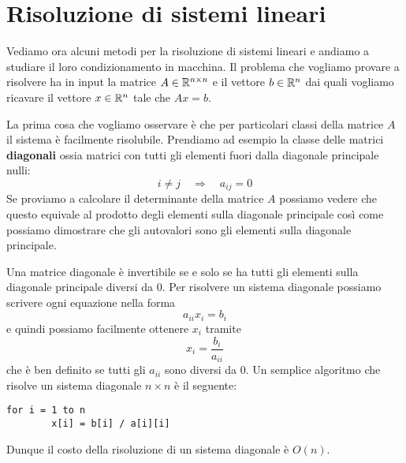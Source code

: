 \section{Risoluzione di sistemi lineari}
Vediamo ora alcuni metodi per la risoluzione di sistemi lineari e andiamo a studiare il loro condizionamento
in macchina. Il problema che vogliamo provare a risolvere ha in input la matrice $A \in \mathbb{R}^{n \times n}$ e il
vettore $b \in \mathbb{R}^n$ dai quali vogliamo ricavare il vettore $x \in \mathbb{R}^n$ tale che $A x = b$.

La prima cosa che vogliamo osservare è che per particolari classi della matrice $A$ il sistema è facilmente
risolubile. Prendiamo ad esempio la classe delle matrici \textbf{diagonali} ossia matrici con tutti gli elementi
fuori dalla diagonale principale nulli:
\[ i \neq j \quad \Rightarrow \quad a_{ij} = 0 \]
Se proviamo a calcolare il determinante della matrice $A$ possiamo vedere che questo equivale al prodotto degli
elementi sulla diagonale principale così come possiamo dimostrare che gli autovalori sono gli elementi sulla
diagonale principale.

Una matrice diagonale è invertibile se e solo se ha tutti gli elementi sulla diagonale principale diversi da 0.
Per risolvere un sistema diagonale possiamo scrivere ogni equazione nella forma
\[ a_{ii} x_i = b_i \]
e quindi possiamo facilmente ottenere $x_i$ tramite
\[ x_i = \frac{b_i}{a_{ii}} \]
che è ben definito se tutti gli $a_{ii}$ sono diversi da 0. Un semplice algoritmo che risolve un sistema diagonale
$n \times n$ è il seguente:
\begin{lstlisting}[language=pseudo, style=pseudo-style]
	for i = 1 to n
		x[i] = b[i] / a[i][i]
\end{lstlisting}
Dunque il costo della risoluzione di un sistema diagonale è $O(n)$.
